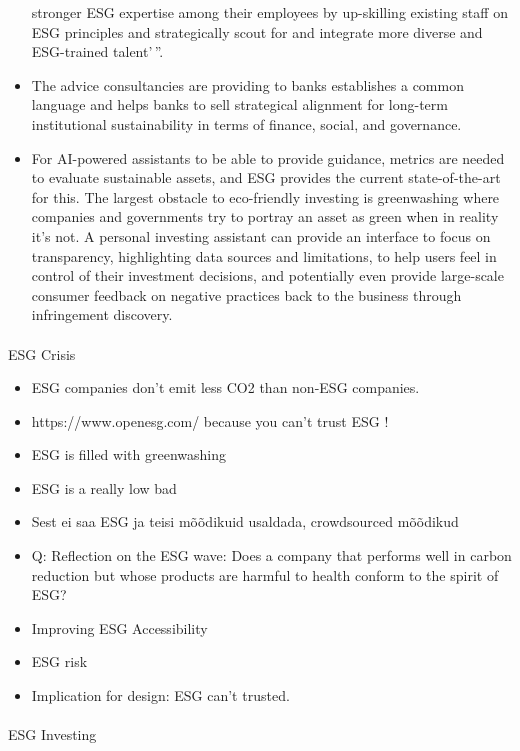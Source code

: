 \documentclass[
  letterpaper,
  DIV=11,
  numbers=noendperiod]{scrartcl}
\makeatletter
\let\oldparagraph\paragraph
\renewcommand{\paragraph}{
    \@ifstar
      \xxxParagraphStar
      \xxxParagraphNoStar
  }
\newcommand{\xxxParagraphStar}[1]{\oldparagraph*{#1}\mbox{}}
\newcommand{\xxxParagraphNoStar}[1]{\oldparagraph{#1}\mbox{}}
\makeatother
\begin{document}
\begin{itemize}
  stronger ESG expertise among their employees by up-skilling existing
  staff on ESG principles and strategically scout for and integrate more
  diverse and ESG-trained talent'\,''.
\item
  The advice consultancies are providing to banks establishes a common
  language and helps banks to sell strategical alignment for long-term
  institutional sustainability in terms of finance, social, and
  governance.
\item
  For AI-powered assistants to be able to provide guidance, metrics are
  needed to evaluate sustainable assets, and ESG provides the current
  state-of-the-art for this. The largest obstacle to eco-friendly
  investing is greenwashing where companies and governments try to
  portray an asset as green when in reality it's not. A personal
  investing assistant can provide an interface to focus on transparency,
  highlighting data sources and limitations, to help users feel in
  control of their investment decisions, and potentially even provide
  large-scale consumer feedback on negative practices back to the
  business through infringement discovery.
\end{itemize}

\paragraph{ESG Crisis}\label{esg-crisis}

\begin{itemize}
\item
  ESG companies don't emit less CO2 than non-ESG companies.
\item
  https://www.openesg.com/ because you can't trust ESG
  \citep{aikmanESGDAOOut2022} !
\item
  ESG is filled with greenwashing
\item
  ESG is a really low bad
\item
  Sest ei saa ESG ja teisi mõõdikuid usaldada, crowdsourced mõõdikud
\item
  Q: Reflection on the ESG wave: Does a company that performs well in
  carbon reduction but whose products are harmful to health conform to
  the spirit of ESG?
\item
  Improving ESG Accessibility
\item
  ESG risk
\item
  Implication for design: ESG can't trusted.
\end{itemize}

\paragraph{ESG Investing}\label{esg-investing}
\end{document}
